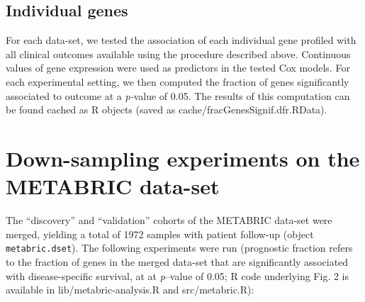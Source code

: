 \subsection{Individual genes}
For each data-set, we tested the association of each individual gene profiled
with all clinical outcomes available using the procedure described above.
Continuous values of gene expression were used as predictors in the tested Cox
models.  For each experimental setting, we then computed the fraction of genes
significantly associated to outcome at a \emph{p-}value of 0.05.  The results of
this computation can be found cached as \textsf{R} objects (saved as
\textsf{cache/fracGenesSignif.dfr.RData}).

\section{Down-sampling experiments on the METABRIC data-set}
The ``discovery'' and ``validation'' cohorts of the METABRIC data-set were
merged, yielding a total of 1972 samples with patient follow-up (object
\texttt{metabric.dset}).  The following experiments were run (prognostic
fraction refers to the fraction of genes in the merged data-set that are
significantly associated with disease-specific survival, at at \emph{p}--value
of 0.05; \textsf{R} code underlying Fig. 2 is available in
\textsf{lib/metabric-analysis.R} and \textsf{src/metabric.R}):
